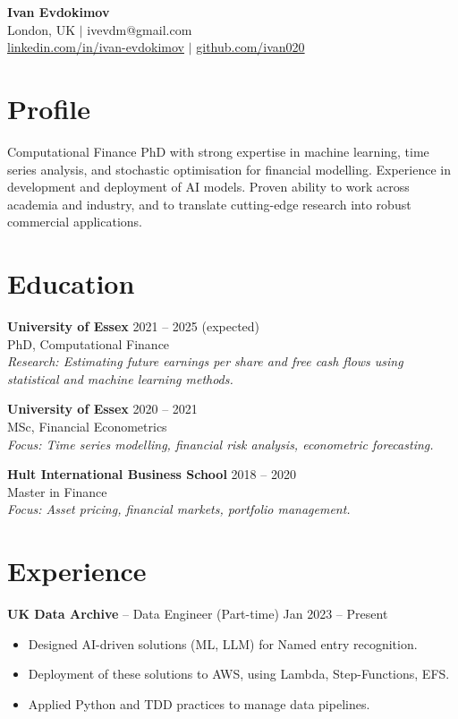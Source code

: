 \documentclass[a4paper,10pt]{article}
\begin{document}
\begin{center}
  \textbf{\Large Ivan Evdokimov} \\[0.2em]
  London, UK \quad $\vert$ \quad ivevdm@gmail.com \\
  \href{https://www.linkedin.com/in/ivan-evdokimov}{linkedin.com/in/ivan-evdokimov} \quad $\vert$ \quad \href{https://github.com/ivan020}{github.com/ivan020}
\end{center}

\section*{Profile}
Computational Finance PhD with strong expertise in machine learning, time series analysis, and stochastic optimisation for financial modelling. Experience in development and deployment of AI models. Proven ability to work across academia and industry, and to translate cutting-edge research into robust commercial applications.

\section*{Education}
\textbf{University of Essex} \hfill 2021 -- 2025 (expected)\\
PhD, Computational Finance\\
\textit{Research: Estimating future earnings per share and free cash flows using statistical and machine learning methods.}

\textbf{University of Essex} \hfill 2020 -- 2021\\
MSc, Financial Econometrics\\
\textit{Focus: Time series modelling, financial risk analysis, econometric forecasting.}

\textbf{Hult International Business School} \hfill 2018 -- 2020\\
Master in Finance\\
\textit{Focus: Asset pricing, financial markets, portfolio management.}

\section*{Experience}
\textbf{UK Data Archive} -- Data Engineer (Part-time) \hfill Jan 2023 -- Present\\
\begin{itemize}[leftmargin=*]
  \item Designed AI-driven solutions (ML, LLM) for Named entry recognition.
  \item Deployment of these solutions to AWS, using Lambda, Step-Functions, EFS.
  \item Applied Python and TDD practices to manage data pipelines.
\end{itemize}
\end{document}
